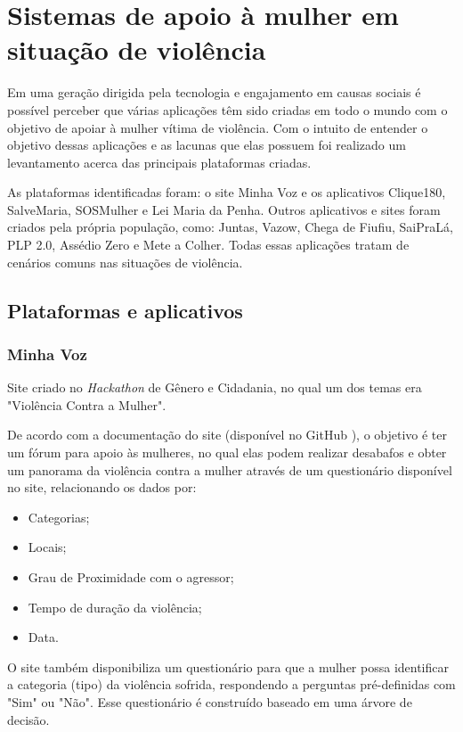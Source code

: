 \chapter{Sistemas de apoio à mulher em situação de violência} \label{cap:sistemas_relacionados}

Em uma geração dirigida pela tecnologia e engajamento em causas sociais é possível perceber que várias aplicações têm sido criadas em todo o mundo 
com o objetivo de apoiar à mulher vítima de violência. Com o intuito de entender o objetivo dessas aplicações e as lacunas que elas possuem
foi realizado um levantamento acerca das principais plataformas criadas. 

As plataformas identificadas foram: o site Minha Voz \cite{minhavoz_site} e 
os aplicativos Clique180, SalveMaria, SOSMulher e Lei Maria da Penha. Outros aplicativos e sites foram criados pela própria população, como: Juntas, Vazow, 
Chega de Fiufiu, 
SaiPraLá, PLP 2.0, Assédio Zero e Mete a Colher. Todas essas aplicações tratam de cenários comuns nas situações de 
violência.

\section{Plataformas e aplicativos}

\subsection*{Minha Voz}

Site criado no \textit{Hackathon} de Gênero e Cidadania, no qual
um dos temas era "Violência Contra a Mulher". 

De acordo com a documentação do site (disponível no GitHub \cite{minhavoz_repo}), o objetivo é ter um fórum para apoio às mulheres, no qual elas podem
realizar desabafos e obter um panorama da violência contra a mulher através de um questionário
disponível no site, relacionando os dados por:

\begin{itemize}
	\item Categorias;
	\item Locais;
	\item Grau de Proximidade com o agressor;
	\item Tempo de duração da violência;
	\item Data.
\end{itemize}

O site também disponibiliza um questionário para que a mulher possa identificar a categoria (tipo) da violência sofrida, respondendo a perguntas pré-definidas 
com "Sim" ou "Não". Esse questionário é construído baseado em uma árvore de decisão.

